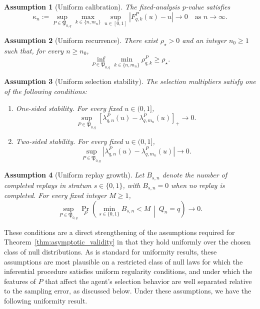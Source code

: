 \documentclass[10pt]{article}
\newtheorem{assumption}{Assumption}
\begin{document}
\begin{assumption}[Uniform calibration]
\label{asspt:uniform_calibration}
The fixed-analysis p-value satisfies
\[
\kappa_n
:=
\sup_{P\in\mathfrak P_{0,q}}
\max_{k\in\{n,m_n\}}
\sup_{u\in[0,1]}
\left|F^P_{q,k}(u)-u\right|
\to0
\quad\text{as }n\to\infty.
\]
\end{assumption}
\begin{assumption}[Uniform recurrence]
\label{asspt:uniform_recurrence}
There exist $\rho_\star>0$ and an integer $n_0\ge1$ such that, for every $n\ge n_0$,
\[
\inf_{P\in\mathfrak P_{0,q}}
\min_{k\in\{n,m_n\}}
\rho^P_{q,k}
\ge \rho_\star.
\]
\end{assumption}

\begin{assumption}[Uniform selection stability]
\label{asspt:uniform_lambda_stability}
The selection multipliers satisfy one of the following conditions:
\begin{enumerate}[label=(\alph*)]
\item \textit{One-sided stability.} For every fixed $u\in(0,1]$,
\[
\sup_{P\in\mathfrak P_{0,q}}
\left[\lambda^P_{q,n}(u)-\lambda^P_{q,m_n}(u)\right]_+
\to0.
\]

\item \textit{Two-sided stability.} For every fixed $u\in(0,1]$,
\[
\sup_{P\in\mathfrak P_{0,q}}
\left|\lambda^P_{q,n}(u)-\lambda^P_{q,m_n}(u)\right|
\to0.
\]
\end{enumerate}
\end{assumption}

\begin{assumption}[Uniform replay growth]
\label{asspt:uniform_replay_growth}
Let $B_{s,n}$ denote the number of completed replays in stratum $s\in\{0,1\}$, with $B_{s,n}=0$ when no replay is completed. For every fixed integer $M\ge1$,
\[
\sup_{P\in\mathfrak P_{0,q}}
\Pr_P\!\left(
\min_{s\in\{0,1\}}B_{s,n}<M
\,\middle|\,Q_n=q
\right)
\to0.
\]
\end{assumption}

These conditions are a direct strengthening of the assumptions required for Theorem~\ref{thm:asymptotic_validity} in that they hold uniformly over the chosen class of null distributions. As is standard for uniformity results, these assumptions are most plausible on a restricted class of null laws for which the inferential procedure satisfies uniform regularity conditions, and under which the features of $P$ that affect the agent's selection behavior are well separated relative to the sampling error, as discussed below. Under these assumptions, we have the following uniformity result.
\end{document}
